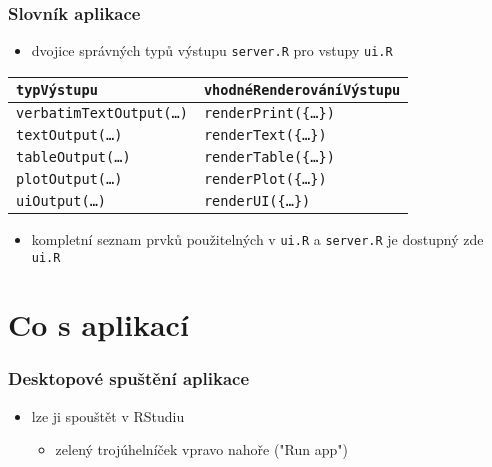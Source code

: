 \documentclass[t]{beamer}
\begin{document}
\begin{frame}[fragile]
  \frametitle{Slovník aplikace}
  \begin{itemize}
    \item dvojice správných typů výstupu \texttt{server.R} pro vstupy
    \texttt{ui.R}
  \end{itemize}
  \begin{table}[H]
  \centering
  \begin{tabular}{ll}
    \hline
    \texttt{typVýstupu} & \texttt{vhodnéRenderováníVýstupu} \\
    \hline
    \texttt{verbatimTextOutput(\ldots)} & \texttt{renderPrint(\{\ldots\})} \\
    \texttt{textOutput(\ldots)} & \texttt{renderText(\{\ldots\})} \\
    \texttt{tableOutput(\ldots)} & \texttt{renderTable(\{\ldots\})} \\
    \texttt{plotOutput(\ldots)} & \texttt{renderPlot(\{\ldots\})} \\
    \texttt{uiOutput(\ldots)} & \texttt{renderUI(\{\ldots\})} \\
    \hline
  \end{tabular}
  \end{table}
  \begin{itemize}
    \item kompletní seznam prvků použitelných v \texttt{ui.R}
    a \texttt{server.R} je dostupný zde
    \texttt{ui.R}
  \end{itemize}
  \begin{center}
    \href{https://shiny.rstudio.com/reference/shiny/latest/}{%
    }
  \end{center}
\end{frame}



\section{Co s aplikací}


\begin{frame}
  \frametitle{Desktopové spuštění aplikace}
  \begin{itemize}
    \item lze ji spouštět v RStudiu
    \begin{itemize}
      \item zelený trojúhelníček vpravo nahoře ("Run app")
    \end{itemize}
  \end{itemize}
\end{frame}
\end{document}
